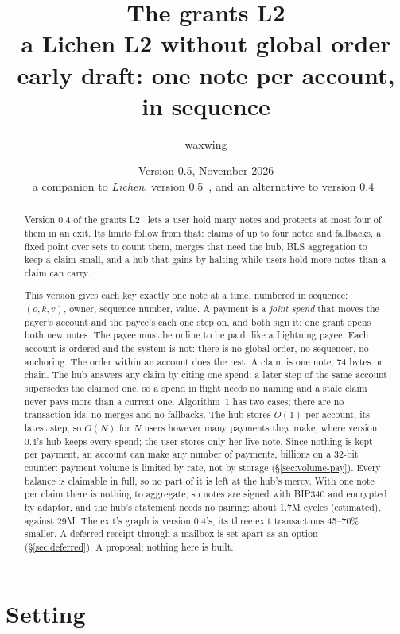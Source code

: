 \documentclass[11pt]{article}
\title{\textbf{The grants L2}\\a Lichen L2 without global order\\[2pt]\large early draft: one note per account, in sequence}
\author{waxwing}
\date{Version 0.5, November 2026\\[2pt]\small a companion to \emph{Lichen}, version 0.5~\cite{lichen}, and an alternative to version 0.4~\cite{grants04}}
\theoremstyle{plain}
\theoremstyle{definition}
\begin{document}
\maketitle

\begin{abstract}
Version 0.4 of the grants L2~\cite{grants04} lets a user hold many notes
and protects at most four of them in an exit. Its limits follow from
that: claims of up to four notes and fallbacks, a fixed point over sets
to count them, merges that need the hub, BLS aggregation to keep a claim
small, and a hub that gains by halting while users hold more notes than
a claim can carry.

This version gives each key exactly one note at a time, numbered in
sequence: $(o, k, v)$, owner, sequence number, value. A payment is a
\emph{joint spend} that moves the payer's account and the payee's each
one step on, and both sign it; one grant opens both new notes. The payee
must be online to be paid, like a Lightning payee. Each account is
ordered and the system is not: there is no global order, no sequencer,
no anchoring. The order within an account does the rest. A claim is one
note, 74 bytes on chain. The hub answers any claim by citing one spend:
a later step of the same account supersedes the claimed one, so a
spend in flight needs no naming and a stale claim never pays more than
a current one. Algorithm~1 has two cases; there are no transaction ids,
no merges and no fallbacks. The hub stores $O(1)$ per account, its
latest step, so $O(N)$ for $N$ users however many payments they make,
where version 0.4's hub keeps every spend; the user stores only her
live note. Since nothing is kept per payment, an account can make any
number of payments, billions on a 32-bit counter: payment volume is
limited by rate, not by storage (\S\ref{sec:volume-pay}). Every balance
is claimable in full, so no part of it is left at the hub's mercy. With
one note per
claim there is nothing to aggregate, so notes are signed with BIP340 and
encrypted by adaptor, and the hub's statement needs no pairing: about
1.7M cycles (estimated), against 29M. The exit's graph is version
0.4's, its three exit transactions 45--70\% smaller. A deferred receipt
through a mailbox is set apart as an option (\S\ref{sec:deferred}). A
proposal; nothing here is built.
\end{abstract}

\tableofcontents

\section{Setting}
\end{document}
